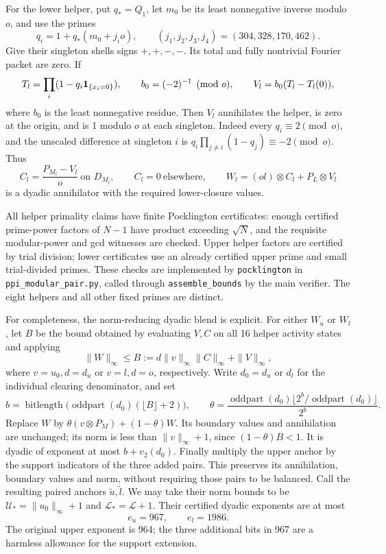 For the lower helper, put $q_*=Q_1$, let $m_0$ be its least nonnegative
inverse modulo $o$, and use the primes
\[
 q_i=1+q_*(m_0+j_i o),\qquad (j_1,j_2,j_3,j_4)=(304,328,170,462).
\]
Give their singleton shells signs $+,+,-,-$.  Its total and fully
nontrivial Fourier packet are zero.  If
\[
 T_l=\prod_i(1-q_i\mathbf1_{\{x_i=0\}}),\qquad
 b_0=(-2)^{-1}\pmod o,\qquad V_l=b_0(T_l-T_l(0)),
\]
where $b_0$ is the least nonnegative residue. Then $V_l$ annihilates the helper, is zero at the origin, and is 1 modulo
$o$ at each singleton.  Indeed every $q_i\equiv2\pmod o$, and the
unscaled difference at singleton $i$ is
$q_i\prod_{j\ne i}(1-q_j)\equiv-2\pmod o$.  Thus
\[
 C_l=\frac{P_{M_l}-V_l}{o}\ \text{on }D_{M_l},\qquad C_l=0
 \ \text{elsewhere},\qquad
 W_l=(o l)\otimes C_l+P_L\otimes V_l
\]
is a dyadic annihilator with the required lower-closure values.

All helper primality claims have finite Pocklington certificates: enough
certified prime-power factors of $N-1$ have product exceeding $\sqrt N$,
and the requisite modular-power and gcd witnesses are checked.  Upper
helper factors are certified by trial division; lower certificates use
an already certified upper prime and small trial-divided primes.  These
checks are implemented by \texttt{pocklington} in
\texttt{ppi\_modular\_pair.py}, called through \texttt{assemble\_bounds}
by the main verifier.  The eight helpers and all other fixed primes are
distinct.

For completeness, the norm-reducing dyadic blend is explicit.  For
either $W_u$ or $W_l$, let $B$ be the bound obtained by evaluating $V,C$
on all 16 helper activity states and applying
\[
 \|W\|_\infty\le B:=d\|v\|_\infty\|C\|_\infty+\|V\|_\infty,
\]
where $v=u_0,d=d_u$ or $v=l,d=o$, respectively.  Write $d_0=d_u$ or
$d_l$ for the individual clearing denominator, and set
\[
 b=\operatorname{bitlength}\bigl(
       \operatorname{oddpart}(d_0)(\lfloor B\rfloor+2)\bigr),
 \qquad
 \theta=\frac{\operatorname{oddpart}(d_0)
        \lfloor2^b/\operatorname{oddpart}(d_0)\rfloor}{2^b}.
\]
Replace $W$ by $\theta(v\otimes P_M)+(1-\theta)W$.  Its boundary
values and annihilation are unchanged; its norm is less than
$\|v\|_\infty+1$, since $(1-\theta)B<1$.  It is dyadic of exponent
at most $b+v_2(d_0)$.  Finally multiply the upper anchor by the support
indicators of the three added pairs.  This preserves its annihilation,
boundary values and norm, without requiring those pairs to be balanced.
Call the resulting paired anchors $\widetilde u,\widetilde l$.  We may
take their norm bounds to be
$\mathcal U_*=\|u_0\|_\infty+1$ and $\mathcal L_*=\mathcal L+1$.
Their certified dyadic exponents
are at most
\begin{equation}\label{h100:anchor-exponents}
 e_u=967,\qquad e_l=1986.
\end{equation}
The original upper exponent is 964; the three additional bits in 967
are a harmless allowance for the support extension.


